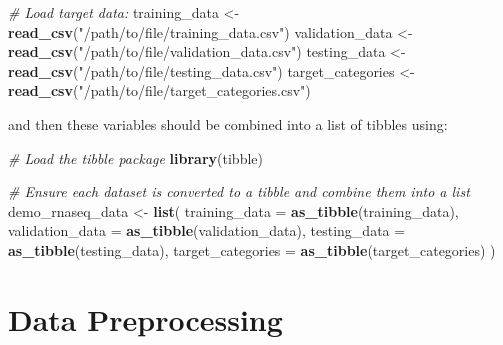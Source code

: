 \documentclass[
]{article}
\newenvironment{Shaded}{\begin{snugshade}}{\end{snugshade}}
\newcommand{\AttributeTok}[1]{\textcolor[rgb]{0.13,0.29,0.53}{#1}}
\newcommand{\CommentTok}[1]{\textcolor[rgb]{0.56,0.35,0.01}{\textit{#1}}}
\newcommand{\FunctionTok}[1]{\textcolor[rgb]{0.13,0.29,0.53}{\textbf{#1}}}
\newcommand{\NormalTok}[1]{#1}
\newcommand{\OtherTok}[1]{\textcolor[rgb]{0.56,0.35,0.01}{#1}}
\newcommand{\StringTok}[1]{\textcolor[rgb]{0.31,0.60,0.02}{#1}}
\begin{document}
\begin{Shaded}
\begin{Highlighting}[]
\CommentTok{\# Load target data:}
\NormalTok{training\_data }\OtherTok{\textless{}{-}} \FunctionTok{read\_csv}\NormalTok{(}\StringTok{"/path/to/file/training\_data.csv"}\NormalTok{)}
\NormalTok{validation\_data }\OtherTok{\textless{}{-}} \FunctionTok{read\_csv}\NormalTok{(}\StringTok{"/path/to/file/validation\_data.csv"}\NormalTok{)}
\NormalTok{testing\_data }\OtherTok{\textless{}{-}} \FunctionTok{read\_csv}\NormalTok{(}\StringTok{"/path/to/file/testing\_data.csv"}\NormalTok{)}
\NormalTok{target\_categories }\OtherTok{\textless{}{-}} \FunctionTok{read\_csv}\NormalTok{(}\StringTok{"/path/to/file/target\_categories.csv"}\NormalTok{)}
\end{Highlighting}
\end{Shaded}

and then these variables should be combined into a list of tibbles
using:

\begin{Shaded}
\begin{Highlighting}[]
\CommentTok{\# Load the tibble package}
\FunctionTok{library}\NormalTok{(tibble)}

\CommentTok{\# Ensure each dataset is converted to a tibble and combine them into a list}
\NormalTok{demo\_rnaseq\_data }\OtherTok{\textless{}{-}} \FunctionTok{list}\NormalTok{(}
  \AttributeTok{training\_data =} \FunctionTok{as\_tibble}\NormalTok{(training\_data),}
  \AttributeTok{validation\_data =} \FunctionTok{as\_tibble}\NormalTok{(validation\_data),}
  \AttributeTok{testing\_data =} \FunctionTok{as\_tibble}\NormalTok{(testing\_data),}
  \AttributeTok{target\_categories =} \FunctionTok{as\_tibble}\NormalTok{(target\_categories)}
\NormalTok{)}
\end{Highlighting}
\end{Shaded}

\hypertarget{data-preprocessing}{%
\section{Data Preprocessing}\label{data-preprocessing}}
\end{document}
